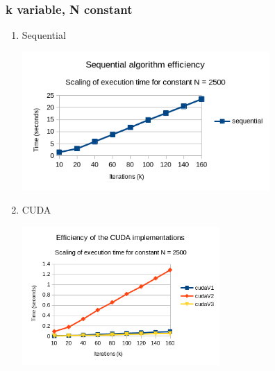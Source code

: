 \documentclass[11pt]{article}
\begin{document}
\subsubsection{k variable, N constant}
\label{sec:org79d88cb}
\begin{enumerate}
\item Sequential
\label{sec:org803c10c}
\begin{center}
\includegraphics[height=200]{./images/seq-efficiency.png}
\end{center}
\pagebreak
\item CUDA
\label{sec:orgfc6cc0e}
\begin{center}
\includegraphics[height=200]{./images/cuda-efficiency.png}
\end{center}
\end{enumerate}
\end{document}
